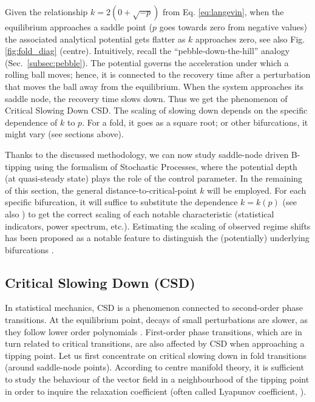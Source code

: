 Given the relationship $k = 2(0 + \sqrt{-p})$ from Eq. \ref{eq:langevin}, when the equilibrium approaches a saddle point ($p$ goes towards zero from negative values) the associated analytical potential gets flatter as $k$ approaches zero, see also Fig. \ref{fig:fold_diag} (centre). Intuitively, recall the ``pebble-down-the-hill'' analogy (Sec.~\ref{subsec:pebble}). The potential governs the acceleration under which a rolling ball moves; hence, it is connected to the recovery time after a perturbation that moves the ball away from the equilibrium. When the system approaches its saddle node, the recovery time slows down. Thus we get the phenomenon of Critical Slowing Down \gls{CSD}. The scaling of slowing down depends on the specific dependence of $k$ to $p$. For a fold, it goes as a square root; or other bifurcations, it might vary (see sections above). 

Thanks to the discussed methodology, we can now study saddle-node driven B-tipping using the formalism of Stochastic Processes, where the potential depth (at quasi-steady state) plays the role of the control parameter. In the remaining of this section, the general distance-to-critical-point $k$ will be employed. For each specific bifurcation, it will suffice to substitute the dependence $k = k(p)$ (see also \textcite{Kuehn2011}) to get the correct scaling of each notable characteristic (statistical indicators, power spectrum, etc.). Estimating the scaling of observed regime shifts has been proposed as a notable feature to distinguish the (potentially) underlying bifurcations \citep{Meisel2012a,Bury2020}. \\


\tocless\subsection{Critical Slowing Down (CSD)}
\label{subsec:CSD}

In statistical mechanics, \gls{CSD} is a phenomenon connected to second-order phase transitions. At the equilibrium point, decays of small perturbations are slower, as they follow lower order polynomials \cite{strogatz2018nonlinear}. First-order phase transitions, which are in turn related to critical transitions, are also affected by \gls{CSD} when approaching a tipping point. Let us first concentrate on critical slowing down in fold transitions (around saddle-node points). According to centre manifold theory, it is sufficient to study the behaviour of the vector field in a neighbourhood of the tipping point in order to inquire the relaxation coefficient (often called Lyapunov coefficient, \textcite{Kuehn2011}).

